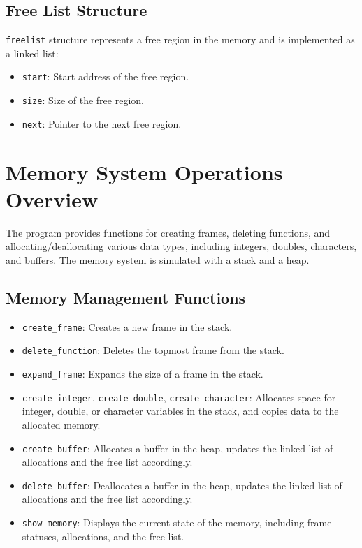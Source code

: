 \documentclass{article}
\begin{document}
\subsection*{Free List Structure}
\texttt{freelist} structure represents a free region in the memory and is implemented as a linked list:
\begin{itemize}
    \item \texttt{start}: Start address of the free region.
    \item \texttt{size}: Size of the free region.
    \item \texttt{next}: Pointer to the next free region.
\end{itemize}

\section*{Memory System Operations Overview}

The program provides functions for creating frames, deleting functions, and allocating/deallocating various data types, including integers, doubles, characters, and buffers. The memory system is simulated with a stack and a heap.

\subsection*{Memory Management Functions}
\begin{itemize}
    \item \texttt{create\_frame}: Creates a new frame in the stack.
    \item \texttt{delete\_function}: Deletes the topmost frame from the stack.
    \item \texttt{expand\_frame}: Expands the size of a frame in the stack.
    \item \texttt{create\_integer}, \texttt{create\_double}, \texttt{create\_character}: Allocates space for integer, double, or character variables in the stack, and copies data to the allocated memory.
    \item \texttt{create\_buffer}: Allocates a buffer in the heap, updates the linked list of allocations and the free list accordingly.
    \item \texttt{delete\_buffer}: Deallocates a buffer in the heap, updates the linked list of allocations and the free list accordingly.
    \item \texttt{show\_memory}: Displays the current state of the memory, including frame statuses, allocations, and the free list.
\end{itemize}
\end{document}
